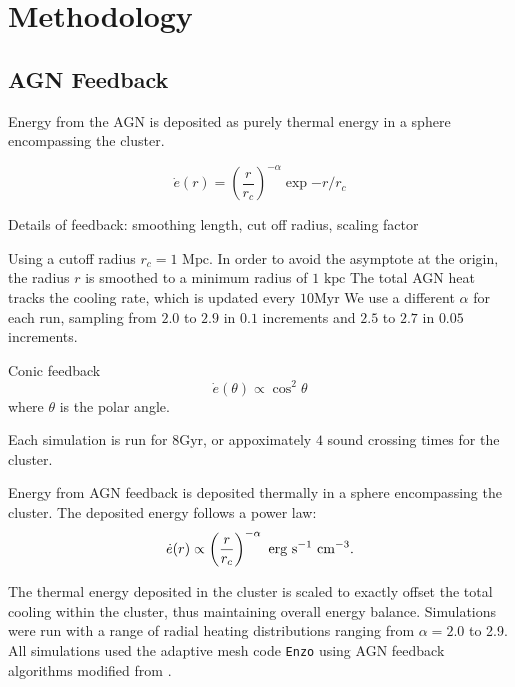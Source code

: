 \documentclass[iop,apjl, twocolappendix]{emulateapj}   %
\begin{document}
\section{Methodology}
\label{sec:methodology}

\subsection{AGN Feedback}
\textbullet Energy from the AGN is deposited as purely thermal energy in a sphere
encompassing the cluster.

\begin{equation}
	\dot{e}(r) = \left( \frac{r}{r_c} \right )^{-\alpha} \exp { -r/r_c}
\end{equation}

\textbullet Details of feedback: smoothing length, cut off radius, scaling factor

Using a cutoff radius $r_c= 1\text{ Mpc}.$ In order to avoid the asymptote at
the origin, the radius $r$ is smoothed to a minimum radius of $1\text{ kpc}$
The total AGN heat tracks the cooling rate, which is updated every $10
\text{Myr}$ We use a different $\alpha$ for each run, sampling from $2.0$ to
$2.9$ in $0.1$ increments and $2.5$ to $2.7$ in $0.05$ increments.

\textbullet Conic feedback
\begin{equation}
	\dot{e}(\theta) \propto \cos^2 \theta 
\end{equation}
where $\theta$ is the polar angle.

\textbullet Each simulation is run for $8 \text{Gyr}$, or appoximately $4$ sound crossing
times for the cluster. 


Energy from AGN feedback is deposited thermally in a sphere encompassing the
cluster. The deposited energy follows a power law:
\vspace{-0.5em}
\begin{equation}
	\dot{e}(r) \propto \left( \frac{r}{r_c} \right )^{-\alpha} \text{ erg} \text{ s}^{-1} \text{ cm}^{-3}.
	\vspace{-0.5em}
\end{equation}

\noindent
The thermal energy deposited in the cluster is scaled to exactly offset the
total cooling within the cluster, thus maintaining overall energy balance.
Simulations were run with a range of radial heating distributions ranging from
$\alpha = 2.0$ to 2.9. 
All simulations used the adaptive mesh code \texttt{Enzo} \cite{bryan_enzo:_2014} using AGN feedback algorithms modified from
\cite{meece_jr_agn_2016,meece_triggering_2017}.
\end{document}
